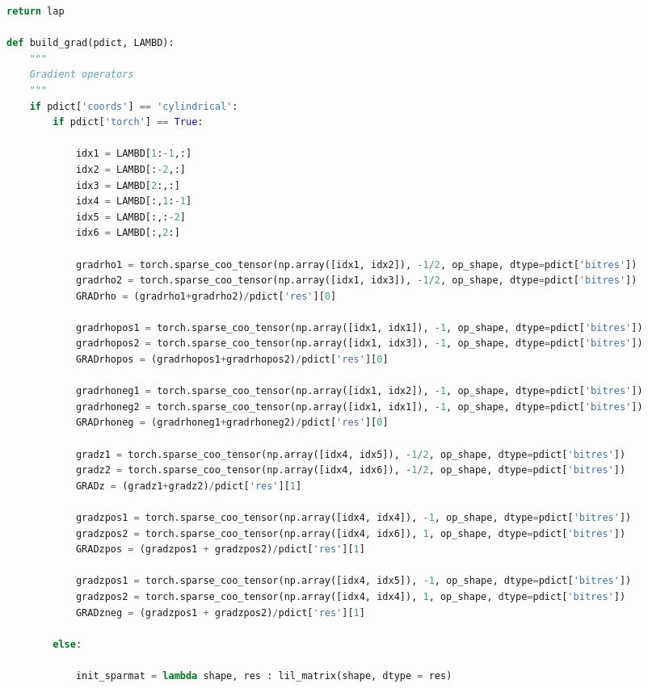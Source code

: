 \begin{spacing}{1}
\begin{lstlisting}[frame=single, language=Python]
    return lap

def build_grad(pdict, LAMBD):
    """
    Gradient operators 
    """
    if pdict['coords'] == 'cylindrical': 
        if pdict['torch'] == True:
            
            idx1 = LAMBD[1:-1,:]
            idx2 = LAMBD[:-2,:]
            idx3 = LAMBD[2:,:]
            idx4 = LAMBD[:,1:-1]
            idx5 = LAMBD[:,:-2]
            idx6 = LAMBD[:,2:]
            
            gradrho1 = torch.sparse_coo_tensor(np.array([idx1, idx2]), -1/2, op_shape, dtype=pdict['bitres'])
            gradrho2 = torch.sparse_coo_tensor(np.array([idx1, idx3]), -1/2, op_shape, dtype=pdict['bitres'])
            GRADrho = (gradrho1+gradrho2)/pdict['res'][0]
            
            gradrhopos1 = torch.sparse_coo_tensor(np.array([idx1, idx1]), -1, op_shape, dtype=pdict['bitres'])
            gradrhopos2 = torch.sparse_coo_tensor(np.array([idx1, idx3]), -1, op_shape, dtype=pdict['bitres'])
            GRADrhopos = (gradrhopos1+gradrhopos2)/pdict['res'][0]
            
            gradrhoneg1 = torch.sparse_coo_tensor(np.array([idx1, idx2]), -1, op_shape, dtype=pdict['bitres'])
            gradrhoneg2 = torch.sparse_coo_tensor(np.array([idx1, idx1]), -1, op_shape, dtype=pdict['bitres'])
            GRADrhoneg = (gradrhoneg1+gradrhoneg2)/pdict['res'][0]
            
            gradz1 = torch.sparse_coo_tensor(np.array([idx4, idx5]), -1/2, op_shape, dtype=pdict['bitres'])
            gradz2 = torch.sparse_coo_tensor(np.array([idx4, idx6]), -1/2, op_shape, dtype=pdict['bitres'])
            GRADz = (gradz1+gradz2)/pdict['res'][1]
            
            gradzpos1 = torch.sparse_coo_tensor(np.array([idx4, idx4]), -1, op_shape, dtype=pdict['bitres'])
            gradzpos2 = torch.sparse_coo_tensor(np.array([idx4, idx6]), 1, op_shape, dtype=pdict['bitres'])
            GRADzpos = (gradzpos1 + gradzpos2)/pdict['res'][1]
            
            gradzpos1 = torch.sparse_coo_tensor(np.array([idx4, idx5]), -1, op_shape, dtype=pdict['bitres'])
            gradzpos2 = torch.sparse_coo_tensor(np.array([idx4, idx4]), 1, op_shape, dtype=pdict['bitres'])
            GRADzneg = (gradzpos1 + gradzpos2)/pdict['res'][1]
            
        else:
            
            init_sparmat = lambda shape, res : lil_matrix(shape, dtype = res)
            

\end{lstlisting}
\end{spacing}
